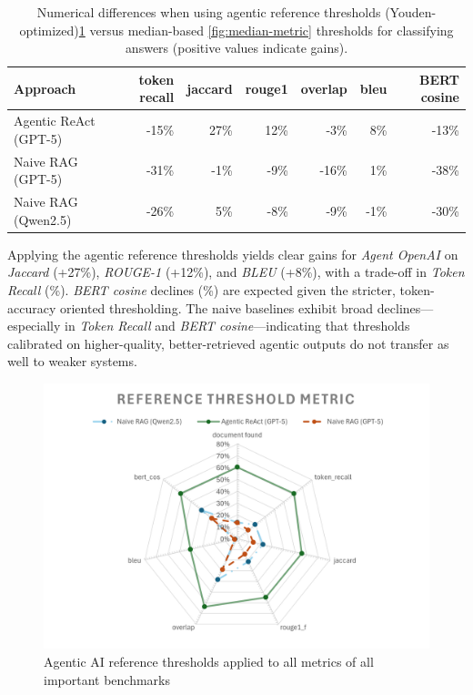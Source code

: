 \begin{table}[htbp]
    \centering
    \begin{tabular}{l r r r  r r r}
        \hline
        Approach &  token recall & jaccard & rouge1 & overlap & bleu & \gls{BERT} cosine \\
        \hline
        Agentic ReAct (\gls{GPT}-5) &  -15\% & 27\% & 12\% & -3\% & 8\% & -13\% \\
        Naive \gls{RAG} (\gls{GPT}-5) &  -31\% & -1\% & -9\% & -16\% & 1\% & -38\% \\
        Naive \gls{RAG} (Qwen2.5) &  -26\% & 5\% & -8\% & -9\% & -1\% & -30\% \\
        \hline
    \end{tabular}
    \caption{Numerical differences when using agentic reference thresholds (Youden-optimized)\ref{fig:Youden-metric} versus median-based \ref{fig:median-metric} thresholds for classifying answers (positive values indicate gains).}
    \label{tab:gain-loss-reference-median}
\end{table}

Applying the agentic reference thresholds yields clear gains for \textit{Agent OpenAI} on \textit{Jaccard} (+27\%), \textit{ROUGE-1} (+12\%), and \textit{BLEU} (+8\%), with a trade-off in \textit{Token Recall} (\%). \textit{\gls{BERT} cosine} declines (\%) are expected given the stricter, token-accuracy oriented thresholding. The naive baselines exhibit broad declines—especially in \textit{Token Recall} and \textit{\gls{BERT} cosine}—indicating that thresholds calibrated on higher-quality, better-retrieved agentic outputs do not transfer as well to weaker systems.
\begin{figure}
    \centering
    \includegraphics[width=0.75\linewidth]{Figures/Reference Threshold Metric.png}
    \caption{Agentic AI reference thresholds applied to all metrics of all important benchmarks}\label{fig:Youden-metric}
\end{figure}

